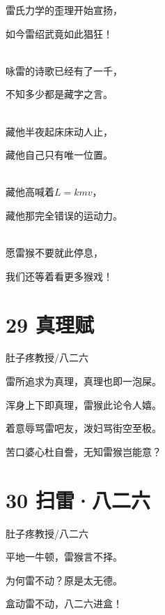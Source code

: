 \documentclass[UTF8,12pt,oneside]{ctexbook}
\begin{document}
        \begin{center}
            雷氏力学的歪理开始宣扬，
            
            如今雷绍武竟如此猖狂！
        
            ~\\
            咏雷的诗歌已经有了一千，
            
            不知多少都是藏字之言。
            
            ~\\
            藏他半夜起床床动人止，
            
            藏他自己只有唯一位置。
            
            ~\\
            藏他高喊着$L=kmv$，
            
            藏他那完全错误的运动力。
            
            ~\\
            愿雷猴不要就此停息，
            
            我们还等着看更多猴戏！
        \end{center}
        
        \section{29 真理赋}
        \begin{center}
            肚子疼教授/八二六
        \end{center}
            
        \begin{center}
            雷所追求为真理，真理也即一泡屎。
        
            浑身上下即真理，雷猴此论令人嬉。
        
            着意辱骂雷吧友，泼妇骂街空至极。
            
            苦口婆心杜自誊，无知雷猴岂能意？
        \end{center}
        
        \section{30 扫雷·八二六}
        \begin{center}
            肚子疼教授/八二六
        \end{center}
            
        \begin{center}
            平地一牛顿，雷猴言不择。
            
            为何雷不动？原是太无德。
        
            盒动雷不动，八二六进盒！
        \end{center}
        
\end{document}
